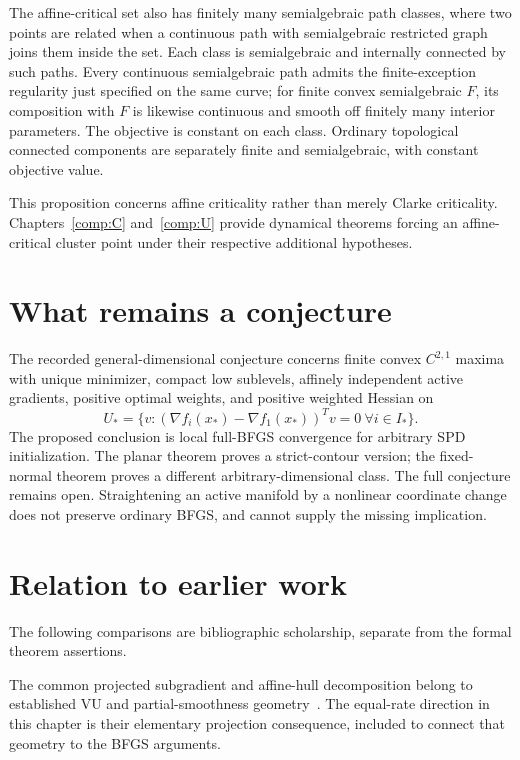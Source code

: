 The affine-critical set also has finitely many semialgebraic path classes, where two points are related when a continuous path with semialgebraic restricted graph joins them inside the set. Each class is semialgebraic and internally connected by such paths. Every continuous semialgebraic path admits the finite-exception regularity just specified on the same curve; for finite convex semialgebraic $F$, its composition with $F$ is likewise continuous and smooth off finitely many interior parameters. The objective is constant on each class. Ordinary topological connected components are separately finite and semialgebraic, with constant objective value.

This proposition concerns affine criticality rather than merely Clarke criticality. Chapters~\ref{comp:C} and~\ref{comp:U} provide dynamical theorems forcing an affine-critical cluster point under their respective additional hypotheses.



\section{What remains a conjecture}
The recorded general-dimensional conjecture concerns finite convex $C^{2,1}$ maxima with unique minimizer, compact low sublevels, affinely independent active gradients, positive optimal weights, and positive weighted Hessian on
\[
 U_* =\{v:(\nabla f_i(x_*)-\nabla f_1(x_*))^Tv=0\ \forall i\in I_*\}.
\]
The proposed conclusion is local full-BFGS convergence for arbitrary SPD initialization. The planar theorem proves a strict-contour version; the fixed-normal theorem proves a different arbitrary-dimensional class. The full conjecture remains open. Straightening an active manifold by a nonlinear coordinate change does not preserve ordinary BFGS, and cannot supply the missing implication.


\section*{Relation to earlier work}
The following comparisons are bibliographic scholarship, separate from the formal theorem assertions.

The common projected subgradient and affine-hull decomposition belong to established VU and partial-smoothness geometry~\cite{geom_Lewis2002,LL}. The equal-rate direction in this chapter is their elementary projection consequence, included to connect that geometry to the BFGS arguments.


